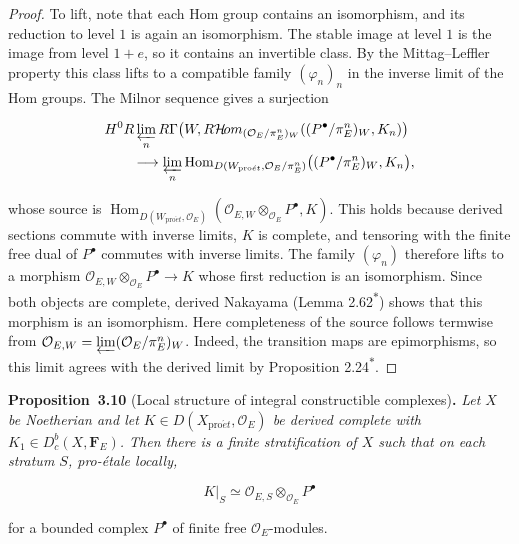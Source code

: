 \documentclass[11pt]{article}
\newenvironment{bpstatement}[2]{\par\addvspace{0.6\baselineskip}\noindent\textbf{#1}#2\textbf{.}\enspace\ignorespaces}
  {\par\addvspace{0.4\baselineskip}}
\newenvironment{bpstatementit}[2]{\begin{bpstatement}{#1}{#2}\itshape\ignorespaces}{\end{bpstatement}}
\newcommand{\bpout}[1]{#1\textsuperscript{\hyperlink{bp-outside}{\ensuremath{\ast}}}}
\providecommand{\Dbc}{}\renewcommand{\Dbc}{D^b_c}
\providecommand{\Hom}{}\renewcommand{\Hom}{\operatorname{Hom}}
\providecommand{\cHom}{}\renewcommand{\cHom}{R\mathcal{H}\!om}
\begin{document}
\begin{proof}[{Proof}]
To lift, note that each Hom group contains an isomorphism, and its reduction to level \(1\) is again an isomorphism. The stable image at level \(1\) is the image from level \(1+e\), so it contains an invertible class. By the Mittag–Leffler property this class lifts to a compatible family \((\varphi_n)_n\) in the inverse limit of the Hom groups. The Milnor sequence gives a surjection

\[
\begin{aligned}
&H^0R\varprojlim_n R\Gamma\bigl(W,\cHom_{(\mathcal O_E/\pi_E^n)_W}
((P^\bullet/\pi_E^n)_W,K_n)\bigr)\\
&\qquad\longrightarrow
\varprojlim_n\Hom_{D(W_{\mathrm{pro}\acute{e}t},\mathcal O_E/\pi_E^n)}
\bigl((P^\bullet/\pi_E^n)_W,K_n\bigr),
\end{aligned}
\]

whose source is \(\Hom_{D(W_{\mathrm{pro}\acute{e}t},\mathcal O_E)}(\mathcal O_{E,W}\otimes_{\mathcal O_E}P^\bullet,K)\). This holds because derived sections commute with inverse limits, \(K\) is complete, and tensoring with the finite free dual of \(P^\bullet\) commutes with inverse limits. The family \((\varphi_n)\) therefore lifts to a morphism \(\mathcal O_{E,W}\otimes_{\mathcal O_E}P^\bullet\to K\) whose first reduction is an isomorphism. Since both objects are complete, derived Nakayama (Lemma \bpout{2.62}) shows that this morphism is an isomorphism. Here completeness of the source follows termwise from \(\mathcal O_{E,W}=\varprojlim(\mathcal O_E/\pi_E^n)_W\). Indeed, the transition maps are epimorphisms, so this limit agrees with the derived limit by Proposition \bpout{2.24}.
\end{proof}

\label{bp31}%
\begin{bpstatementit}{Proposition~3.10}{ (Local structure of integral constructible complexes)}
Let \(X\) be Noetherian and let \(K\in D(X_{\mathrm{pro}\acute{e}t},\mathcal O_E)\) be derived complete with \(K_1\in\Dbc(X,\mathbf F_E)\). Then there is a finite stratification of \(X\) such that on each stratum \(S\), pro-étale locally,

\[
K|_S\simeq \mathcal O_{E,S}\otimes_{\mathcal O_E}P^\bullet
\]

for a bounded complex \(P^\bullet\) of finite free \(\mathcal O_E\)-modules.
\end{bpstatementit}
\end{document}
